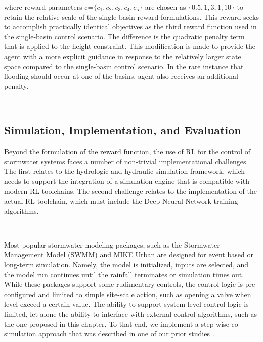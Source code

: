 where reward parameters  c=$\{c_1,c_2,c_3,c_4,c_5\}$ are chosen as $\{0.5,1,3,1,10\}$ to retain the relative scale of the single-basin reward formulations.
This reward seeks to accomplish practically identical objectives as the third reward function used in the single-basin control scenario.
The difference is the quadratic penalty term that is applied to the height constraint.
This modification is made to provide the agent with a more explicit guidance in response to the relatively larger state space compared to the single-basin control scenario.
In the rare instance that flooding should occur at one of the basins, agent also receives an additional penalty.

\

\subsection{Simulation, Implementation, and Evaluation}
Beyond the formulation of the reward function, the use of RL for the control of stormwater systems faces a number of non-trivial implementational challenges.
The first relates to the hydrologic and hydraulic simulation framework, which needs to support the integration of a simulation engine that is compatible with modern RL toolchains.
The second challenge relates to the implementation of the actual RL toolchain, which must include the Deep Neural Network training algorithms.

\

Most popular stormwater modeling packages, such as the Stormwater Management Model (SWMM) \cite{Rossman2010Storm5.1} and MIKE Urban \cite{Elliott2007ADrainage} are designed for event based or long-term simulation.
Namely, the model is initialized, inputs are selected, and the model run continues until the rainfall terminates or simulation times out.
While these packages support some rudimentary controls, the control logic is pre-configured and limited to simple site-scale action, such as opening a valve when level exceed a certain value.
The ability to support system-level control logic is limited, let alone the ability to interface with external control algorithms, such as the one proposed in this chapter.
To that end, we implement a step-wise co-simulation approach that was described in one of our prior studies \cite{Mullapudi2017}.

\

